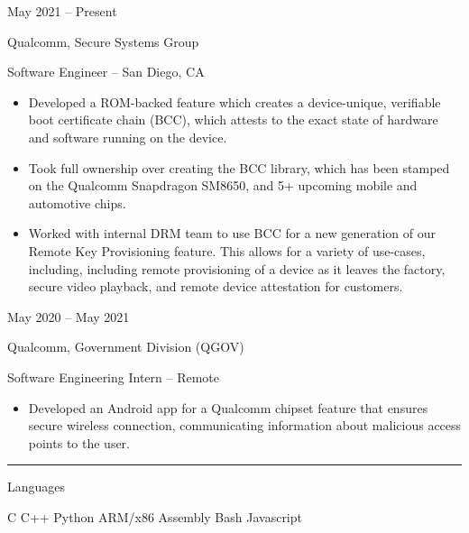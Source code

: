 \documentclass[a4paper]{article}
\newlength{\cvcolumngapwidth}
\newlength{\cvleftcolumnwidth}
\newlength{\cvrightcolumnwidth}
\newcommand{\cvsectionstyle}[1]{{\normalsize\cvsectionfont\textcolor{cvsectioncolor}{#1}}}
\newcommand{\cvtitlestyle}[1]{{\large\cvtitlefont\textcolor{cvtitlecolor}{#1}}}
\newcommand{\cvdurationstyle}[1]{{\small\cvdurationfont\textcolor{cvdurationcolor}{#1}}}
\newcommand{\cvheadingstyle}[1]{{\normalsize\cvheadingfont\textcolor{cvheadingcolor}{#1}}}
\newcommand{\italicstyle}[1]{{\small\italicfont\textcolor{cvsectioncolor}{#1}}}
\newlength{\cvafteritemskipamount}
\newlength{\cvaftersectionskipamount}
\newlength{\cvaftertitleskipamount}
\newlength{\cvparskip}
\newcommand{\cvsection}[1]{
    \begin{minipage}[t]{\cvleftcolumnwidth}
        \raggedleft\cvsectionstyle{#1}
    \end{minipage}%
    \hspace{\cvcolumngapwidth}%
    \begin{minipage}[t]{\cvrightcolumnwidth}
        \textcolor{cvrulecolor}{\rule{\cvrightcolumnwidth}{0.3mm}}
    \end{minipage}

    \vspace{\cvaftersectionskipamount}
}
\newcommand{\cvitem}[2]{
    \begin{minipage}[t]{\cvleftcolumnwidth}
        \raggedleft #1
    \end{minipage}%
    \hspace{\cvcolumngapwidth}%
    \begin{minipage}[t]{\cvrightcolumnwidth}
        \setlength{\parskip}{\cvparskip} #2
    \end{minipage}

    \vspace{\cvafteritemskipamount}
}
\newcommand{\cvtitle}[1]{
    \cvtitlestyle{#1}

    \vspace{\cvaftertitleskipamount}
    \vspace{-\cvparskip}
}
\begin{document}
\cvitem{
    \cvdurationstyle{May 2021 -- Present}
}{
    \cvtitle{Qualcomm, Secure Systems Group}

    \italicstyle{Software Engineer  --  San Diego, CA}

    \normalsize
    \begin{itemize}[leftmargin=*]
      \item Developed a ROM-backed feature which creates a device-unique, verifiable boot certificate chain (BCC), which attests to the exact state of hardware and software running on the device.
      \item Took full ownership over creating the BCC library, which has been stamped on the Qualcomm Snapdragon SM8650, and 5+ upcoming mobile and automotive chips.
      \item Worked with internal DRM team to use BCC for a new generation of our Remote Key Provisioning feature. This allows for a variety of use-cases, including, including remote provisioning of a device as it leaves the factory, secure video playback, and remote device attestation for customers.
    \end{itemize}
    \vspace{3mm}
}

\cvitem{
    \cvdurationstyle{May 2020 -- May 2021}
}{
    \cvtitle{Qualcomm, Government Division (QGOV)}

    \italicstyle{Software Engineering Intern  --  Remote}

    \normalsize
    \begin{itemize}[leftmargin=*]
        \item Developed an Android app for a Qualcomm chipset feature that ensures secure wireless connection,
          communicating information about malicious access points to the user.
    \end{itemize}
}

\vspace{5mm}


\cvsection{\LARGE \textcolor{emphasiscolor}{EXPERTISE}}

\vspace{5mm}

\cvitem{
    \cvheadingstyle{Languages}
}{
  C \hspace{12mm} C++ \hspace{12mm} Python \hspace{12mm} ARM/x86 Assembly \hspace{12mm} Bash \hspace{12mm} Javascript
  \vspace{1mm}
}
\end{document}
